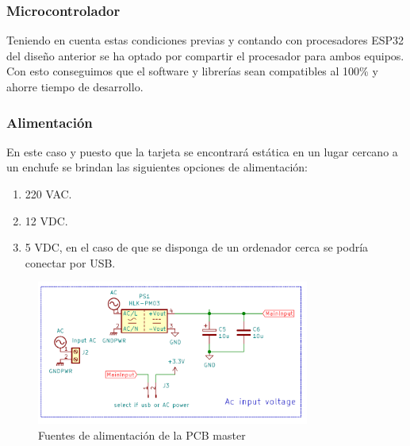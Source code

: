 \documentclass[a4paper ,12pt, onecolumn]{article}
\begin{document}
        \subsubsection{Microcontrolador} 
            Teniendo en cuenta estas condiciones previas y contando con procesadores ESP32 del diseño anterior se ha optado por compartir 
            el procesador para ambos equipos. Con esto conseguimos que el software y librerías sean compatibles al 100\% y ahorre tiempo
            de desarrollo.
        \subsubsection{Alimentación} 
            En este caso y puesto que la tarjeta se encontrará estática en un lugar cercano a un enchufe se brindan las siguientes opciones
            de alimentación:
            \begin{enumerate}
                \item 220 VAC.
                \item 12 VDC.
                \item 5 VDC, en el caso de que se disponga de un ordenador cerca se podría conectar por USB.
            \end{enumerate}
            \begin{center}
                \begin{figure}[h]
                    \centering
                    \includegraphics[width=0.8\textwidth]{../receiver_main_power.PNG}
                    \caption{Fuentes de alimentación de la PCB master}
                    \label{fig:mesh1}
                \end{figure}    
            \end{center}    
\end{document}

